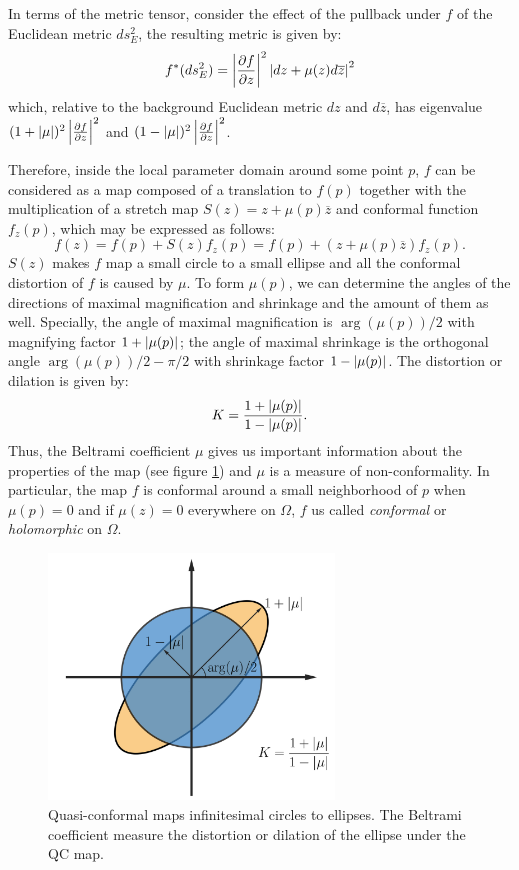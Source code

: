 \documentclass[review,onefignum,onetabnum]{siamonline190516}
\begin{document}
In terms of the metric tensor, consider the effect of the pullback under $f$ of the Euclidean metric $ds^2_E$, the resulting metric is given by:
\begin{equation}
    f^*(ds^2_E) = \left\vert \frac{\partial f}{\partial z} \right\vert^2 \left\vert dz + \mu(z)d\overline{z} \right\vert^2
\end{equation}
which, relative to the background Euclidean metric $dz$ and $d\overline{z}$, has eigenvalue $(1+\left\vert \mu \right\vert)^2 \left\vert \frac{\partial f}{\partial z} \right\vert^2$ and $(1-\left\vert \mu \right\vert)^2 \left\vert \frac{\partial f}{\partial z} \right\vert^2$. 

Therefore, inside the local parameter domain around some point $p$, $f$ can be considered as a map composed of a translation to $f(p)$ together with the multiplication of a stretch map $S(z) = z + \mu(p)\overline{z}$ and conformal function $f_z(p)$, which may be expressed as follows:
\begin{equation}\label{local f}
    f(z) =  f(p)+S(z)f_z(p) = f(p)+(z+\mu(p)\overline{z})f_z(p).
\end{equation}
$S(z)$ makes $f$ map a small circle to a small ellipse and all the conformal distortion of $f$ is caused by $\mu$. To form $\mu(p)$, we can determine the angles of the directions of maximal magnification and shrinkage and the amount of them as well. Specially, the angle of maximal magnification is $\arg(\mu(p))/2$ with magnifying factor $1+\left\vert \mu(p) \right\vert$; the angle of maximal shrinkage is the orthogonal angle $\arg(\mu(p))/2 - \pi/2$ with shrinkage factor $1-\left\vert \mu(p) \right\vert$. The distortion or dilation is given by:
\begin{equation}
    K = \frac{1+\left\vert \mu(p) \right\vert}{1-\left\vert \mu(p) \right\vert}.
\end{equation}
Thus, the Beltrami coefficient $\mu$ gives us important information about the properties of the map (see figure \ref{fig3}) and $\mu$ is a measure of non-conformality. In particular, the map $f$ is conformal around a small neighborhood of $p$ when $\mu(p)=0$ and if $\mu(z)=0$ everywhere on $\Omega$, $f$ us called \textit{conformal} or \textit{holomorphic} on $\Omega$.

\begin{figure}
    \begin{center}
        \includegraphics[width=7.6cm]{background_bc1.png}
    \end{center}
    \caption{Quasi-conformal maps infinitesimal circles to ellipses. The Beltrami coefficient measure the distortion or dilation of the ellipse under the QC map.}
    \label{fig3}
\end{figure}
\end{document}
